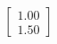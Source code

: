 \documentclass[preview]{standalone}
\begin{document}
\begin{align*}
\begin{bmatrix} 1.00 \\ 1.50 \end{bmatrix}
\end{align*}
\end{document}
